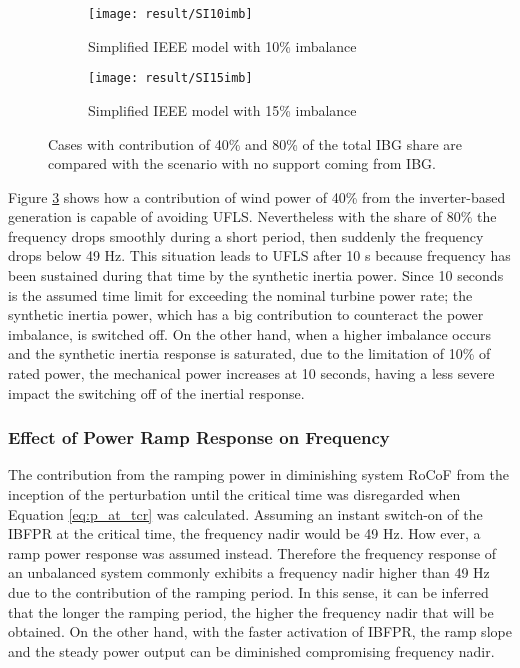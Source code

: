\begin{figure}[h]
	\centering
	\begin{subfigure}[h]{0.49\textwidth}
		\centering
		\texttt{[image: result/SI10imb]}
		\caption{Simplified IEEE model with 10\% imbalance}
		\label{fig:res_ieee_fr10imb}
	\end{subfigure}
	\hfill
	\begin{subfigure}[h]{0.49\textwidth}
		\centering
		\texttt{[image: result/SI15imb]}
		\caption{Simplified IEEE model with 15\% imbalance}
		\label{fig:res_ieee_fr15imb}
	\end{subfigure}
	\caption{Cases with contribution of 40\% and 80\% of the total IBG share are compared with the scenario with no support coming from IBG.}
\end{figure}


Figure \ref{fig:res_ieee_fr15imb} shows how a contribution of wind power of 40\% from the inverter-based generation is capable of avoiding UFLS. Nevertheless with the share of 80\% the frequency drops smoothly during a short period, then suddenly the frequency drops below 49 Hz. This situation leads to UFLS after 10 s because frequency has been sustained during that time by the synthetic inertia power. Since 10 seconds is the assumed time limit for exceeding the nominal turbine power rate; the synthetic inertia power, which has a big contribution to counteract the power imbalance, is switched off. On the other hand, when a higher imbalance occurs and the synthetic inertia response is saturated, due to the limitation of 10\% of rated power, the mechanical power increases at 10 seconds, having a less severe impact the switching off of the inertial response.


\subsubsection{Effect of Power Ramp Response on Frequency}

The contribution from the ramping power in diminishing system RoCoF from the inception of the perturbation until the critical time was disregarded when Equation \eqref{eq:p_at_tcr} was calculated. Assuming an instant switch-on of the IBFPR at the critical time, the frequency nadir would be 49 Hz. How ever, a ramp power response was assumed instead. Therefore the frequency response of an unbalanced system commonly exhibits a frequency nadir higher than 49 Hz due to the contribution of the ramping period. In this sense, it can be inferred that the longer the ramping period, the higher the frequency nadir that will be obtained. On the other hand, with the faster activation of IBFPR, the ramp slope and the steady power output can be diminished compromising frequency nadir. 

